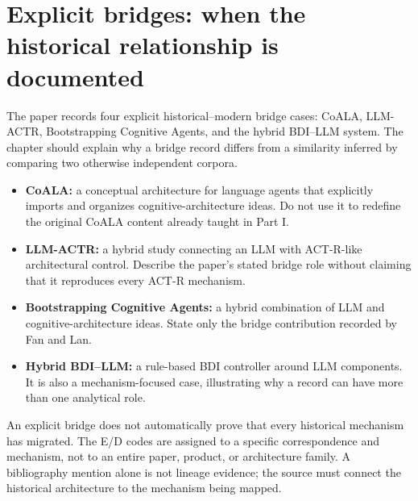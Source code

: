 \section{Explicit bridges: when the historical relationship is documented}
The paper records four explicit historical--modern bridge cases: CoALA, LLM-ACTR, Bootstrapping Cognitive Agents, and the hybrid BDI--LLM system. The chapter should explain why a bridge record differs from a similarity inferred by comparing two otherwise independent corpora.
\begin{itemize}
  \item \textbf{CoALA:} a conceptual architecture for language agents that explicitly imports and organizes cognitive-architecture ideas. Do not use it to redefine the original CoALA content already taught in Part I.
  \item \textbf{LLM-ACTR:} a hybrid study connecting an LLM with ACT-R-like architectural control. Describe the paper's stated bridge role without claiming that it reproduces every ACT-R mechanism.
  \item \textbf{Bootstrapping Cognitive Agents:} a hybrid combination of LLM and cognitive-architecture ideas. State only the bridge contribution recorded by Fan and Lan.
  \item \textbf{Hybrid BDI--LLM:} a rule-based BDI controller around LLM components. It is also a mechanism-focused case, illustrating why a record can have more than one analytical role.
\end{itemize}

\begin{notebox}
An explicit bridge does not automatically prove that every historical mechanism has migrated. The E/D codes are assigned to a specific correspondence and mechanism, not to an entire paper, product, or architecture family. A bibliography mention alone is not lineage evidence; the source must connect the historical architecture to the mechanism being mapped.
\end{notebox}

